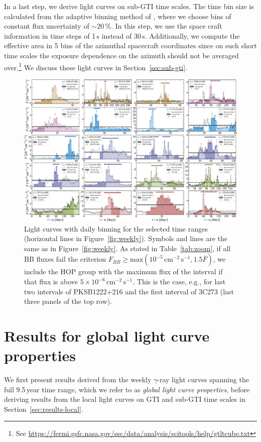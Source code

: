 \documentclass[twocolumn,linenumbers]{aastex62}
\newcommand{\gray}{$\gamma$-ray\xspace}
\begin{document}
In a last step, we derive light curves on sub-GTI time scales. 
The time bin size is calculated from the adaptive binning method of \citet{lott2012}, where we choose bins of constant flux uncertainty of $\sim20\,\%$. 
In this step, we use the space craft information in time steps of 1\,s instead of 30\,s. Additionally, we compute the effective area in 5 bins of the azimuthal spacecraft coordinates since on such short time scales the exposure dependence on the azimuth should not be averaged over.\footnote{See \url{https://fermi.gsfc.nasa.gov/ssc/data/analysis/scitools/help/gtltcube.txt}}
We discuss these light curves in Section~\ref{sec:sub-gti}.


\begin{figure}
    \centering
    \includegraphics[width = .99\linewidth]{lc_daily_tsmin9.pdf}
    \caption{\label{fig:daily} Light curves with daily binning for the selected time ranges (horizontal lines in Figure~\ref{fig:weekly}). Symbols and lines are the same as in Figure~\ref{fig:weekly}. 
    As stated in Table~\ref{tab:zoom}, if all BB fluxes fail the criterion $F_{BB} \geqslant \mathrm{max}(10^{-5}\,\mathrm{cm}^{-2}\,\mathrm{s}^{-1}, 1.5 \bar{F})$, we include the HOP group with the maximum flux of the interval if that flux is above $5\times 10^{-6}\,\mathrm{cm}^{-2}\,\mathrm{s}^{-1}$. This is the case, e.g., for last two intervals of PKSB1222+216 and the first interval of 3C273 (last three panels of the top row).}
\end{figure}

\section{Results for global light curve properties}
\label{sec:results-global}
We first present results derived from the weekly \gray light curves spanning the full 9.5\,year time range, which we refer to as \emph{global light curve properties}, before deriving results from the local light curves on GTI and sub-GTI time scales in Section~\ref{sec:results-local}.
\end{document}
